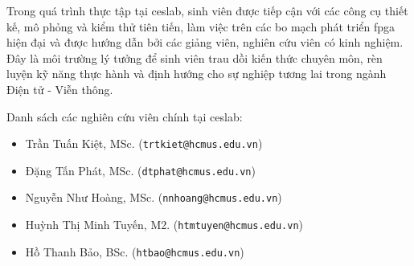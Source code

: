 Trong quá trình thực tập tại \acrshort{ceslab}, sinh viên được tiếp cận với các công cụ thiết kế, mô phỏng và kiểm thử tiên tiến, làm việc trên các bo mạch phát triển \acrshort{fpga} hiện đại và được hướng dẫn bởi các giảng viên, nghiên cứu viên có kinh nghiệm. Đây là môi trường lý tưởng để sinh viên trau dồi kiến thức chuyên môn, rèn luyện kỹ năng thực hành và định hướng cho sự nghiệp tương lai trong ngành Điện tử - Viễn thông.


Danh sách các nghiên cứu viên chính tại \acrshort{ceslab}:

\begin{itemize}
    \item Trần Tuấn Kiệt, MSc. (\texttt{trtkiet@hcmus.edu.vn})
    \item Đặng Tấn Phát, MSc. (\texttt{dtphat@hcmus.edu.vn})
    \item Nguyễn Như Hoàng, MSc. (\texttt{nnhoang@hcmus.edu.vn})
    \item Huỳnh Thị Minh Tuyến, M2. (\texttt{htmtuyen@hcmus.edu.vn})
    \item Hồ Thanh Bảo, BSc. (\texttt{htbao@hcmus.edu.vn})
\end{itemize}
